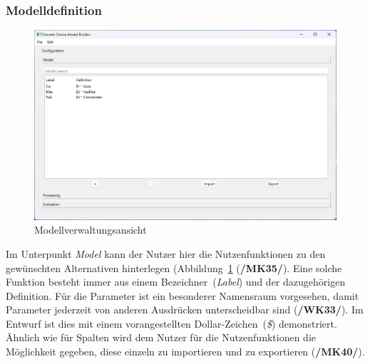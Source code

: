 \documentclass{article}
\begin{document}
\subsubsection{Modelldefinition}
\begin{figure}[H]%
  \centering
  \includegraphics[width=12cm]{specifications/img/gui-screenshots/model.png}
  \caption{Modellverwaltungsansicht}
  \label{gui:fig_model}
\end{figure}
Im Unterpunkt \emph{Model} kann der Nutzer hier die Nutzenfunktionen zu den gewünschten Alternativen hinterlegen (Abbildung~\ref{gui:fig_model} (\textbf{/MK35/}). Eine solche Funktion besteht immer aus einem Bezeichner~(\emph{Label}) und der dazugehörigen Definition. Für die Parameter ist ein besonderer Namensraum vorgesehen, damit Parameter jederzeit von anderen Ausdrücken unterscheidbar sind (\textbf{/WK33/}). Im Entwurf ist dies mit einem vorangestellten Dollar-Zeichen~(\emph{\$}) demonstriert. Ähnlich wie für Spalten wird dem Nutzer für die Nutzenfunktionen die Möglichkeit gegeben, diese einzeln zu importieren und zu exportieren (\textbf{/MK40/}).\\
\end{document}
